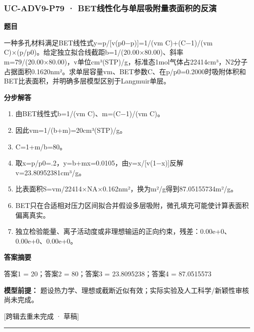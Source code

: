 \documentclass[UTF8,11pt,a4paper]{ctexart}
\begin{document}
\subsubsection*{UC-ADV9-P79 · BET线性化与单层吸附量表面积的反演}
\noindent\textbf{题目}\par
一种多孔材料满足BET线性式y=p/[v(p0−p)]=1/(vm C)+(C−1)/(vm C)×(p/p0)。给定独立拟合线截距b=1/(20.00×80.00)、斜率m=79/(20.00×80.00)，v单位cm³(STP)/g，标准态1mol气体占22414cm³，N2分子占据面积0.1620nm²。求单层容量vm、BET参数C、在p/p0=0.2000时吸附体积和BET比表面积，并明确多层模型区别于Langmuir单层。\par
\medskip\noindent\textbf{分步解答}
\begin{enumerate}
\item 由BET线性式b=1/(vm C)、m=(C−1)/(vm C)。
\item 因此vm=1/(b+m)=20cm³(STP)/g。
\item C=1+m/b=80。
\item 取x=p/p0=.2，y=b+mx=0.0105，由y=x/[v(1−x)]反解v=23.80952381cm³/g。
\item 比表面积S=vm/22414×NA×0.162nm²，换为m²/g得到87.05155734m²/g。
\item BET只在合适相对压力区间拟合并假设多层吸附，微孔填充可能使计算表面积偏离真实。
\item 独立检验能量、离子活动度或非理想输运的正向约束，残差：0.00e+0、0.00e+0、0.00e+0。
\end{enumerate}
\noindent\textbf{答案摘要}\par
答案1 = 20；答案2 = 80；答案3 = 23.8095238；答案4 = 87.0515573\par
\noindent\textbf{模型前提：}
题设热力学、理想或截断近似有效；实际实验及人工科学/新颖性审核尚未完成。\par
\noindent\textcolor{red!65!black}{[跨辑去重未完成 · 草稿]} \par
\medskip\hrule\medskip
{}
\end{document}
